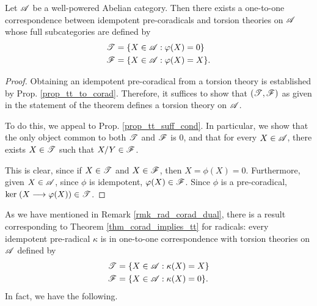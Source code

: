 \begin{thm}\label{thm_corad_implies_tt}
Let $\mathscr{A}$ be a well-powered Abelian category. Then there exists
a one-to-one correspondence between idempotent pre-coradicals and
torsion theories on $\mathscr{A}$ whose full subcategories are defined 
by
\begin{align*}
\mathscr{T} &= \{ X \in \mathscr{A} : \varphi(X) = 0 \} \\
\mathscr{F} &= \{ X \in \mathscr{A} : \varphi(X) = X \}.
\end{align*}
\end{thm}
\begin{proof}
Obtaining an idempotent pre-coradical from a torsion theory is
established by Prop. \ref{prop_tt_to_corad}. Therefore, it suffices
to show that $(\mathscr{T}, \mathscr{F})$ as given in the statement of the
theorem defines a torsion theory on $\mathscr{A}$.

To do this, we appeal to Prop. \ref{prop_tt_suff_cond}. In 
particular, we show that the only object common to both $\mathscr{T}$
and $\mathscr{F}$ is $0$, and that for every $X \in \mathscr{A}$, there 
exists $X \in \mathscr{T}$ such that $X/Y \in \mathscr{F}$.

This is clear, since if $X \in \mathscr{T}$ and $X \in \mathscr{F}$, then
$X = \phi(X) = 0$. Furthermore, given $X \in \mathscr{A}$, since 
$\phi$ is idempotent, $\varphi(X) \in \mathscr{F}$. Since $\phi$ is a 
pre-coradical, $\mathrm{ker}\;(X \longrightarrow \varphi(X)) \in \mathscr{T}$.
\end{proof}

As we have mentioned in Remark \ref{rmk_rad_corad_dual}, there is
a result corresponding to Theorem \ref{thm_corad_implies_tt} for 
radicals: every idempotent pre-radical $\kappa$ is in one-to-one 
correspondence with torsion theories on $\mathscr{A}$ defined by
\begin{align*}
\mathscr{T} &= \{ X \in \mathscr{A} : \kappa(X) = X \} \\
\mathscr{F} &= \{ X \in \mathscr{A} : \kappa(X) = 0 \}.
\end{align*}
In fact, we have the following.

